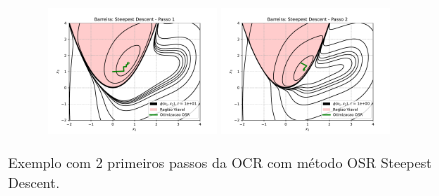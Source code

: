 \documentclass[10pt, a4paper]{article}
\begin{document}
\begin{figure}[H]
  \centering
  \begin{subfigure}[b]{\textwidth}
    \includegraphics[width=0.49\textwidth]{fig_p1/Barreira_Steepest Descent_1.pdf}
    \includegraphics[width=0.49\textwidth]{fig_p1/Barreira_Steepest Descent_2.pdf}
  \end{subfigure}
  \caption{Exemplo com 2 primeiros passos da OCR com método OSR Steepest Descent. }
\end{figure}
\end{document}
